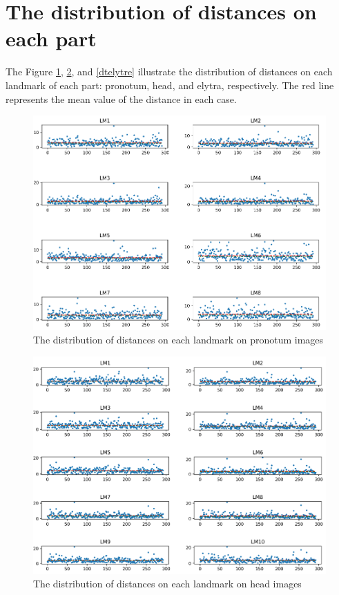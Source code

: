 \documentclass[review]{elsarticle}
\begin{document}
\section{The distribution of distances on each part}
\label{appdixB}
The Figure \ref{dtpronotum}, \ref{dthead}, and \ref{dtelytre} illustrate the distribution of distances on each landmark of each part: pronotum, head, and elytra, respectively. The red line represents the mean value of the distance in each case.
\begin{figure}[htbp]
    \centering
    \includegraphics[width=.95\textwidth]{images/charts/pronotum_2.png}
    \caption{The distribution of distances on each landmark on pronotum images}
    \label{dtpronotum}
\end{figure}

\begin{figure}[htbp]
    \centering
    \includegraphics[width=.95\textwidth]{images/charts/tete_2.png}
    \caption{The distribution of distances on each landmark on head images}
    \label{dthead}
\end{figure}
\end{document}
